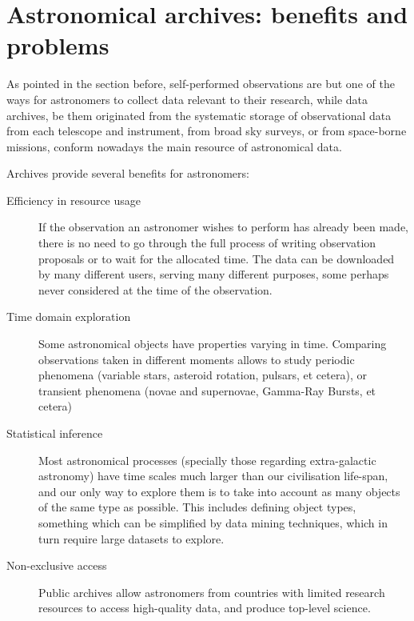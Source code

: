 
\section{Astronomical archives: benefits and problems} %
\label{sec:astronomical_archives}

	As pointed in the section before, self-performed observations
	are but one of the ways for astronomers to collect data
	relevant to their research, while data archives, be them
	originated from the systematic storage of observational data
	from each telescope and instrument, from broad sky surveys, or
	from space-borne missions, conform nowadays the main resource
	of astronomical data.
	
	 Archives provide several benefits for astronomers:

	\begin{description}
		\item[Efficiency in resource usage] If the observation an
		astronomer wishes to perform has already been made, there
		is no need to go through the full process of writing
		observation proposals or to wait for the allocated time.
		The data can be downloaded by many different users, serving
		many different purposes, some perhaps never considered at
		the time of the observation.
		
		\item[Time domain exploration] Some astronomical objects
		have properties varying in time. Comparing observations
		taken in different moments allows to study periodic
		phenomena (variable stars, asteroid rotation, pulsars, et
		cetera), or transient phenomena (novae and supernovae,
		Gamma-Ray Bursts, et cetera)
		
		\item[Statistical inference] Most astronomical processes %
		(specially those regarding extra-galactic astronomy) have
		time scales much larger than our civilisation life-span,
		and our only way to explore them is to take into account as
		many objects of the same type as possible. This includes
		defining object types, something which can be simplified by
		data mining techniques, which in turn require large
		datasets to explore.
		
		\item[Non-exclusive access] Public archives allow
		astronomers from countries with limited research resources
		to access high-quality data, and produce top-level science.
	\end{description}

